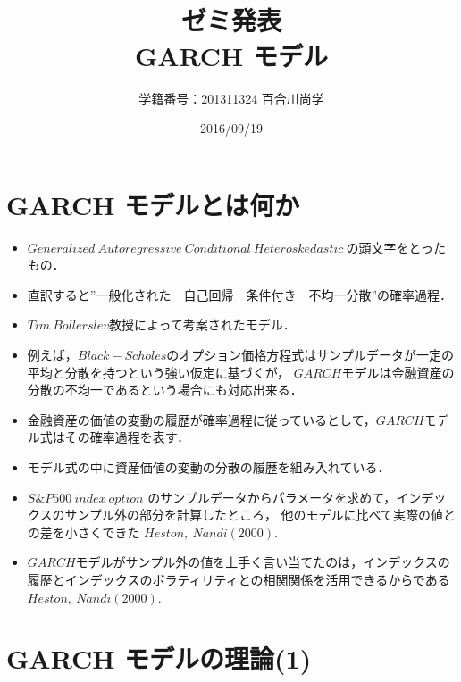 \documentclass[slide,10pt]{jsarticle}
\def\sheet #1{\section*{\centering \large \bfseries #1}}
\begin{document}
\title{\fontsize{45pt}{2cm}\selectfont \\ゼミ発表\\GARCH モデル\\}
\author{\Huge 学籍番号：201311324 百合川尚学}
\date{\Huge 2016/09/19}
\maketitle

\sheet{\Huge GARCH モデルとは何か}

{\huge
\begin{itemize}
	\vspace{5mm}
	\item $Generalized\ Autoregressive\ Conditional\ Heteroskedastic\ $の頭文字をとったもの．
	\vspace{5mm}
	\item 直訳すると''一般化された　自己回帰　条件付き　不均一分散''の確率過程．
	\vspace{5mm}
	\item $Tim\ Bollerslev$教授によって考案されたモデル．
	\vspace{5mm}
	\item 例えば，$Black-Scholes$のオプション価格方程式はサンプルデータが一定の平均と分散を持つという強い仮定に基づくが，
		$GARCH$モデルは金融資産の分散の不均一であるという場合にも対応出来る．
	\vspace{5mm}
	\item 金融資産の価値の変動の履歴が確率過程に従っているとして，$GARCH$モデル式はその確率過程を表す．
	\vspace{5mm}
	\item モデル式の中に資産価値の変動の分散の履歴を組み入れている．
	\vspace{5mm}
	\item $S\&P500\ index\ option$ のサンプルデータからパラメータを求めて，インデックスのサンプル外の部分を計算したところ，
		他のモデルに比べて実際の値との差を小さくできた $Heston,\ Nandi (2000)$.
	\vspace{5mm}
	\item $GARCH$モデルがサンプル外の値を上手く言い当てたのは，インデックスの履歴とインデックスのボラティリティとの相関関係を活用できるからである $Heston,\ Nandi (2000)$.
\end{itemize}
}

\sheet{\Huge GARCH モデルの理論(1)}
\end{document}
